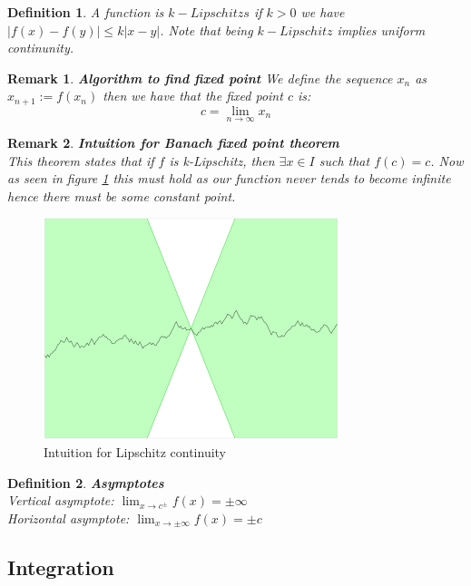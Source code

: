 \documentclass[titlepage]{article}
\newtheorem{remark}{Remark}[section]
\newtheorem{definition}{Definition}
\begin{document}
\begin{definition}
A function is $k-Lipschitzs$ if $k > 0$ we have $|f(x) - f(y)| \leq k|x-y|$. Note that being $k-Lipschitz$ implies uniform continunity. 
\end{definition}

\begin{remark}\textbf{Algorithm to find fixed point}
We define the sequence $x_{n}$ as $x_{n+1} := f(x_{n})$ then we have that the fixed point $c$ is:
$$c = \lim_{n \to \infty} x_{n}$$
\end{remark}

\begin{remark}\textbf{Intuition for Banach fixed point theorem}
\\
This theorem states that if $f$ is k-Lipschitz, then $\exists x \in I$ such that $f(c) = c$. Now as seen in figure \ref{fig:lipschitz} this must hold as our function never tends to become infinite hence there must be some constant point.

\end{remark}

\begin{figure}
    \centering
    \includegraphics[scale = 0.5]{epflLectureNotes/analysis/figures/Lipschitzs.png}
    \caption{Intuition for Lipschitz continuity}
    \label{fig:lipschitz}
\end{figure}

\begin{definition}\textbf{Asymptotes}
\\

Vertical asymptote: $\lim_{x \to c^{\pm}} f(x) = \pm \infty$
\\
Horizontal asymptote: $\lim_{x \to \pm \infty} f(x) = \pm c$
\end{definition}

\subsection{Integration}
\end{document}
